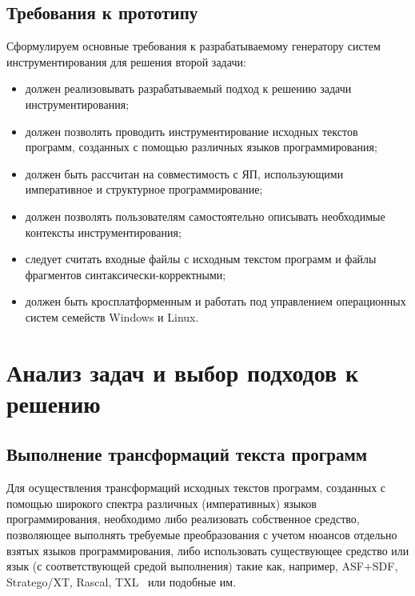 \subsection{Требования к прототипу}

Сформулируем основные требования к разрабатываемому генератору систем инструментирования для решения второй задачи:
\begin{itemize}[noitemsep]
  \item должен реализовывать разрабатываемый подход к решению задачи инструментирования;
  \item должен позволять проводить инструментирование исходных текстов программ, созданных с помощью различных языков программирования;
  \item должен быть рассчитан на совместимость с ЯП, использующими императивное и структурное программирование;
  \item должен позволять пользователям самостоятельно описывать необходимые контексты инструментирования;
  \item следует считать входные файлы с исходным текстом программ и файлы фрагментов синтаксически-корректными;
  \item должен быть кросплатформенным и работать под управлением операционных систем семейств Windows и Linux.
\end{itemize}

\section{Анализ задач и выбор подходов к решению}

\subsection{Выполнение трансформаций текста программ}

Для осуществления трансформаций исходных текстов программ, созданных с помощью широкого спектра различных (императивных) языков программирования, необходимо либо реализовать собственное средство, позволяющее выполнять требуемые преобразования с учетом нюансов отдельно взятых языков программирования, либо использовать существующее средство или язык (с соответствующей средой выполнения) такие как, например, ASF+SDF, Stratego/XT, Rascal, TXL~\cite{cordy2009eating} или подобные им.

